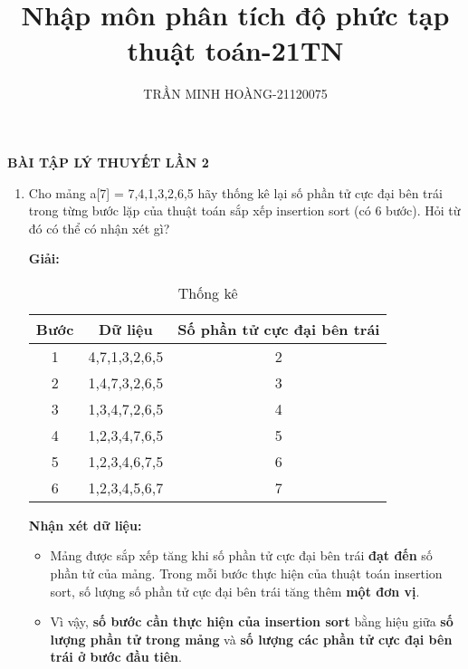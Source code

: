 \documentclass[12pt,a4paper]{article}
\title{\LARGE{\textbf{Nhập môn phân tích độ phức tạp thuật toán-21TN}}}
\author{TRẦN MINH HOÀNG-21120075}
\date{} %
\begin{document}
\maketitle
\begin{center}
    \textbf{BÀI TẬP LÝ THUYẾT LẦN 2}
\end{center}

\begin{enumerate}[label=\textbf{Câu 1.\arabic*} ]
    \item Cho mảng a[7] = {7,4,1,3,2,6,5} hãy thống kê lại số phần tử cực đại bên trái
          trong từng bước lặp của thuật toán sắp xếp insertion sort (có 6 bước). Hỏi từ
          đó có thể có nhận xét gì?

          \textbf{Giải:} 
          \begin{table}[htbp]
              \centering
              \begin{tabular}{|c|c|c|}
                  \hline
                  \textbf{Bước} & \textbf{Dữ liệu} & \textbf{Số phần tử cực đại bên trái} \\
                  \hline
                  1             & 4,7,1,3,2,6,5    & 2                                    \\
                  2             & 1,4,7,3,2,6,5    & 3                                    \\
                  3             & 1,3,4,7,2,6,5    & 4                                    \\
                  4             & 1,2,3,4,7,6,5    & 5                                    \\
                  5             & 1,2,3,4,6,7,5    & 6                                    \\
                  6             & 1,2,3,4,5,6,7    & 7                                    \\
                  \hline
              \end{tabular}
              \caption{Thống kê}
              \label{tab:thongke}
              
          \end{table}
          \begin{flushleft}
            \textbf{Nhận xét dữ liệu: }
          \end{flushleft}
\begin{itemize}[label=$\bullet$] %
    
    \item Mảng được sắp xếp tăng khi số phần tử cực đại bên trái \textbf{đạt đến} số phần tử
          của mảng. Trong mỗi bước thực hiện của thuật toán insertion sort, số lượng số phần tử cực
          đại bên trái tăng thêm \textbf{một đơn vị}.
    \item Vì vậy, \textbf{số bước cần thực hiện của insertion sort} bằng hiệu giữa
          \textbf{số lượng phần tử trong mảng} và \textbf{số lượng các phần tử cực đại
              bên trái ở bước đầu tiên}.
\end{itemize}



\end{enumerate}
\end{document}
